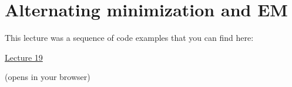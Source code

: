 \section{Alternating minimization and EM}

This lecture was a sequence of code examples that you can find here:

\begin{center}
{\Large
\href{https://ee227c.github.io/code/lecture19.html}{Lecture 19}
}

(opens in your browser)
\end{center}


